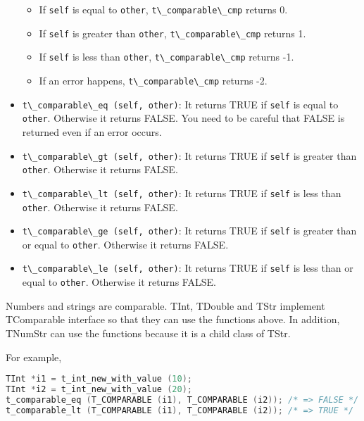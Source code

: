 \begin{itemize}
  \begin{itemize}
  \tightlist
  \item
    If \passthrough{\lstinline!self!} is equal to
    \passthrough{\lstinline!other!},
    \passthrough{\lstinline!t\_comparable\_cmp!} returns 0.
  \item
    If \passthrough{\lstinline!self!} is greater than
    \passthrough{\lstinline!other!},
    \passthrough{\lstinline!t\_comparable\_cmp!} returns 1.
  \item
    If \passthrough{\lstinline!self!} is less than
    \passthrough{\lstinline!other!},
    \passthrough{\lstinline!t\_comparable\_cmp!} returns -1.
  \item
    If an error happens, \passthrough{\lstinline!t\_comparable\_cmp!}
    returns -2.
  \end{itemize}
\item
  \passthrough{\lstinline!t\_comparable\_eq (self, other)!}: It returns
  TRUE if \passthrough{\lstinline!self!} is equal to
  \passthrough{\lstinline!other!}. Otherwise it returns FALSE. You need
  to be careful that FALSE is returned even if an error occurs.
\item
  \passthrough{\lstinline!t\_comparable\_gt (self, other)!}: It returns
  TRUE if \passthrough{\lstinline!self!} is greater than
  \passthrough{\lstinline!other!}. Otherwise it returns FALSE.
\item
  \passthrough{\lstinline!t\_comparable\_lt (self, other)!}: It returns
  TRUE if \passthrough{\lstinline!self!} is less than
  \passthrough{\lstinline!other!}. Otherwise it returns FALSE.
\item
  \passthrough{\lstinline!t\_comparable\_ge (self, other)!}: It returns
  TRUE if \passthrough{\lstinline!self!} is greater than or equal to
  \passthrough{\lstinline!other!}. Otherwise it returns FALSE.
\item
  \passthrough{\lstinline!t\_comparable\_le (self, other)!}: It returns
  TRUE if \passthrough{\lstinline!self!} is less than or equal to
  \passthrough{\lstinline!other!}. Otherwise it returns FALSE.
\end{itemize}

Numbers and strings are comparable. TInt, TDouble and TStr implement
TComparable interface so that they can use the functions above. In
addition, TNumStr can use the functions because it is a child class of
TStr.

For example,

\begin{lstlisting}[language=C]
TInt *i1 = t_int_new_with_value (10);
TInt *i2 = t_int_new_with_value (20);
t_comparable_eq (T_COMPARABLE (i1), T_COMPARABLE (i2)); /* => FALSE */
t_comparable_lt (T_COMPARABLE (i1), T_COMPARABLE (i2)); /* => TRUE */
\end{lstlisting}


